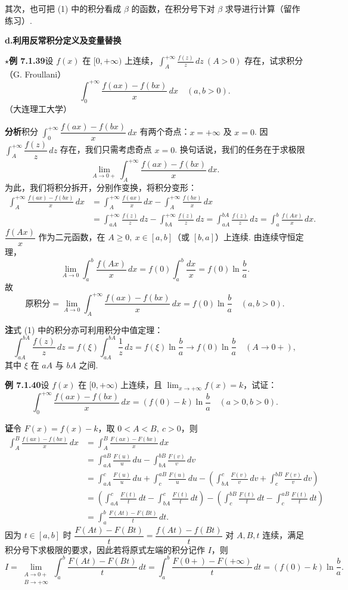 \documentclass[UTF8,12pt,a4paper,fontset=fandol]{ctexart}
\begin{document}
其次，也可把 (1) 中的积分看成 $\beta$ 的函数，在积分号下对 $\beta$ 求导进行计算（留作练习）.

\noindent\textbf{d.\quad 利用反常积分定义及变量替换}

\noindent\textbf{$\star$例 7.1.39}\quad 设 $f(x)$ 在 $[0,+\infty)$ 上连续，$\displaystyle\int_A^{+\infty}\frac{f(z)}z\,dz\ (A>0)$ 存在，试求积分（G. Froullani）
\[
\int_0^{+\infty}\frac{f(ax)-f(bx)}x\,dx\quad(a,b>0).
\]
（大连理工大学）

\noindent\textbf{分析}\quad 积分 $\displaystyle\int_0^{+\infty}\dfrac{f(ax)-f(bx)}x\,dx$ 有两个奇点：$x=+\infty$ 及 $x=0$. 因 $\displaystyle\int_A^{+\infty}\dfrac{f(z)}z\,dz$ 存在，我们只需考虑奇点 $x=0$. 换句话说，我们的任务在于求极限
\[
\lim_{A\to0+}\int_A^{+\infty}\frac{f(ax)-f(bx)}x\,dx.
\]
为此，我们将积分拆开，分别作变换，将积分变形：
\[
\begin{aligned}
\int_A^{+\infty}\frac{f(ax)-f(bx)}x\,dx
&=\int_A^{+\infty}\frac{f(ax)}x\,dx-\int_A^{+\infty}\frac{f(bx)}x\,dx\\
&=\int_{aA}^{+\infty}\frac{f(z)}z\,dz-\int_{bA}^{+\infty}\frac{f(z)}z\,dz
=\int_{aA}^{bA}\frac{f(z)}z\,dz
=\int_a^b\frac{f(Ax)}x\,dx.
\end{aligned}
\tag{1}
\]
$\dfrac{f(Ax)}x$ 作为二元函数，在 $A\ge0,\ x\in[a,b]$（或 $[b,a]$）上连续. 由连续守恒定理，
\[
\lim_{A\to0}\int_a^b\frac{f(Ax)}x\,dx
=f(0)\int_a^b\frac{dx}{x}=f(0)\ln\frac ba.
\]
故
\[
\text{原积分}=\lim_{A\to0}\int_A^{+\infty}\frac{f(ax)-f(bx)}x\,dx
=f(0)\ln\frac ba\quad(a,b>0).
\]

\noindent\textbf{注}\quad 式 (1) 中的积分亦可利用积分中值定理：
\[
\int_{aA}^{bA}\frac{f(z)}z\,dz
=f(\xi)\int_{aA}^{bA}\frac1z\,dz
=f(\xi)\ln\frac ba\to f(0)\ln\frac ba\quad(A\to0+),
\]
其中 $\xi$ 在 $aA$ 与 $bA$ 之间.

\noindent\textbf{例 7.1.40}\quad 设 $f(x)$ 在 $[0,+\infty)$ 上连续，且 $\displaystyle\lim_{x\to+\infty}f(x)=k$，试证：
\[
\int_0^{+\infty}\frac{f(ax)-f(bx)}x\,dx
=(f(0)-k)\ln\frac ba\quad(a>0,b>0).
\]

\noindent\textbf{证}\quad 令 $F(x)=f(x)-k$，取 $0<A<B,\ c>0$，则
\[
\begin{aligned}
\int_A^B\frac{f(ax)-f(bx)}x\,dx
&=\int_A^B\frac{F(ax)-F(bx)}x\,dx\\
&=\int_{aA}^{aB}\frac{F(u)}u\,du-\int_{bA}^{bB}\frac{F(v)}v\,dv\\
&=\int_{aA}^c\frac{F(u)}u\,du+\int_c^{aB}\frac{F(u)}u\,du
-\left(\int_{bA}^c\frac{F(v)}v\,dv+\int_c^{bB}\frac{F(v)}v\,dv\right)\\
&=\left(\int_{aA}^c\frac{F(t)}t\,dt-\int_{bA}^c\frac{F(t)}t\,dt\right)
-\left(\int_c^{bB}\frac{F(t)}t\,dt-\int_c^{aB}\frac{F(t)}t\,dt\right)\\
&=\int_a^b\frac{F(At)-F(Bt)}t\,dt.
\end{aligned}
\]
因为 $t\in[a,b]$ 时 $\dfrac{F(At)-F(Bt)}t=\dfrac{f(At)-f(Bt)}t$ 对 $A,B,t$ 连续，满足积分号下求极限的要求，因此若将原式左端的积分记作 $I$，则
\[
I=\lim_{\substack{A\to0+\\ B\to+\infty}}\int_a^b\frac{F(At)-F(Bt)}t\,dt
=\int_a^b\frac{F(0+)-F(+\infty)}t\,dt
=(f(0)-k)\ln\frac ba.
\]
\end{document}
